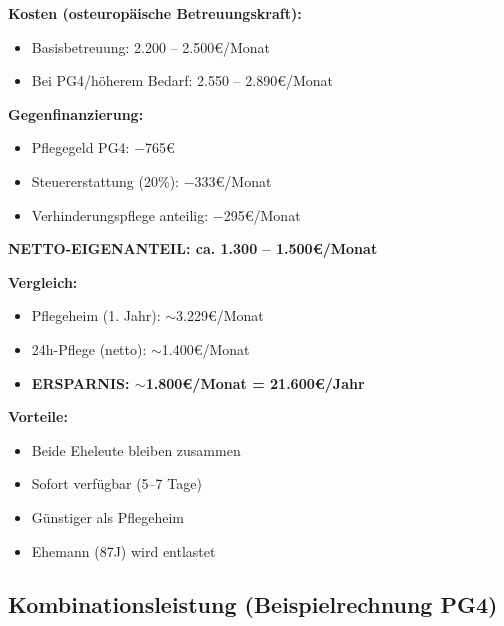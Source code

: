 \documentclass[11pt,a4paper]{article}
\newcommand{\cmark}{\ding{51}}
\begin{document}
\begin{successbox}

\textbf{Kosten (osteuropäische Betreuungskraft):}
\begin{itemize}[noitemsep]
    \item Basisbetreuung: 2.200 -- 2.500\euro{}/Monat
    \item Bei PG4/höherem Bedarf: 2.550 -- 2.890\euro{}/Monat
\end{itemize}

\vspace{0.3cm}
\textbf{Gegenfinanzierung:}
\begin{itemize}[noitemsep]
    \item Pflegegeld PG4: $-$765\euro{}
    \item Steuererstattung (20\%): $-$333\euro{}/Monat
    \item Verhinderungspflege anteilig: $-$295\euro{}/Monat
\end{itemize}

\vspace{0.3cm}
\textbf{NETTO-EIGENANTEIL: ca. 1.300 -- 1.500\euro{}/Monat}

\vspace{0.3cm}
\textbf{Vergleich:}
\begin{itemize}[noitemsep]
    \item Pflegeheim (1. Jahr): $\sim$3.229\euro{}/Monat
    \item 24h-Pflege (netto): $\sim$1.400\euro{}/Monat
    \item \textbf{ERSPARNIS: $\sim$1.800\euro{}/Monat = 21.600\euro{}/Jahr}
\end{itemize}

\vspace{0.3cm}
\textbf{Vorteile:}
\begin{itemize}[noitemsep]
    \item[\cmark] Beide Eheleute bleiben zusammen
    \item[\cmark] Sofort verfügbar (5--7 Tage)
    \item[\cmark] Günstiger als Pflegeheim
    \item[\cmark] Ehemann (87J) wird entlastet
\end{itemize}

\end{successbox}

\subsection{Kombinationsleistung (Beispielrechnung PG4)}
\end{document}
